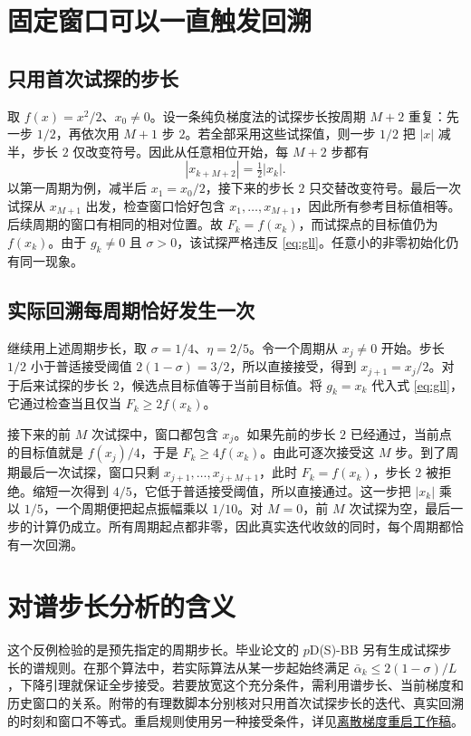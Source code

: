 \documentclass[11pt,a4paper,UTF8,fontset=fandol]{ctexart}
\begin{document}
\section{固定窗口可以一直触发回溯}
\subsection{只用首次试探的步长}

取 \(f(x)=x^2/2\)、\(x_0\ne0\)。设一条纯负梯度法的试探步长按周期 \(M+2\) 重复：先一步 \(1/2\)，再依次用 \(M+1\) 步 \(2\)。若全部采用这些试探值，则一步 \(1/2\) 把 \(|x|\) 减半，步长 \(2\) 仅改变符号。因此从任意相位开始，每 \(M+2\) 步都有
\[
 |x_{k+M+2}|=\tfrac12 |x_k|.
\]
以第一周期为例，减半后 \(x_1=x_0/2\)，接下来的步长 \(2\) 只交替改变符号。最后一次试探从 \(x_{M+1}\) 出发，检查窗口恰好包含 \(x_1,\ldots,x_{M+1}\)，因此所有参考目标值相等。后续周期的窗口有相同的相对位置。故 \(F_k=f(x_k)\)，而试探点的目标值仍为 \(f(x_k)\)。由于 \(g_k\ne0\) 且 \(\sigma>0\)，该试探严格违反 \eqref{eq:gll}。任意小的非零初始化仍有同一现象。

\subsection{实际回溯每周期恰好发生一次}
继续用上述周期步长，取 \(\sigma=1/4\)、\(\eta=2/5\)。令一个周期从 \(x_j\ne0\) 开始。步长 \(1/2\) 小于普适接受阈值 \(2(1-\sigma)=3/2\)，所以直接接受，得到 \(x_{j+1}=x_j/2\)。对于后来试探的步长 \(2\)，候选点目标值等于当前目标值。将 \(g_k=x_k\) 代入式 \eqref{eq:gll}，它通过检查当且仅当 \(F_k\ge2f(x_k)\)。

接下来的前 \(M\) 次试探中，窗口都包含 \(x_j\)。如果先前的步长 \(2\) 已经通过，当前点的目标值就是 \(f(x_j)/4\)，于是 \(F_k\ge4f(x_k)\)。由此可逐次接受这 \(M\) 步。到了周期最后一次试探，窗口只剩 \(x_{j+1},\ldots,x_{j+M+1}\)，此时 \(F_k=f(x_k)\)，步长 \(2\) 被拒绝。缩短一次得到 \(4/5\)，它低于普适接受阈值，所以直接通过。这一步把 \(|x_k|\) 乘以 \(1/5\)，一个周期便把起点振幅乘以 \(1/10\)。对 \(M=0\)，前 \(M\) 次试探为空，最后一步的计算仍成立。所有周期起点都非零，因此真实迭代收敛的同时，每个周期都恰有一次回溯。

\section{对谱步长分析的含义}
这个反例检验的是预先指定的周期步长。毕业论文的 \(p\)D(S)-BB 另有生成试探步长的谱规则。在那个算法中，若实际算法从某一步起始终满足 \(\bar\alpha_k\le2(1-\sigma)/L\)，下降引理就保证全步接受。若要放宽这个充分条件，需利用谱步长、当前梯度和历史窗口的关系。附带的有理数脚本分别核对只用首次试探步长的迭代、真实回溯的时刻和窗口不等式。重启规则使用另一种接受条件，详见\href{https://taitai2025.github.io/assets/documents/research/restart-projected-bb.pdf}{离散梯度重启工作稿}。
\end{document}
